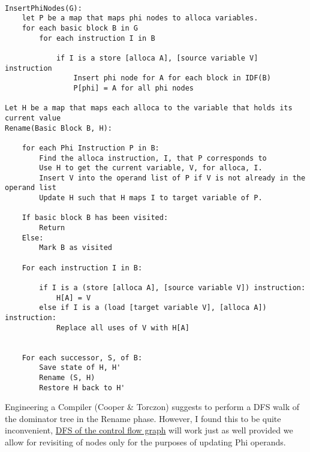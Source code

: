 \documentclass{article}
\begin{document}
\begin{verbatim}

InsertPhiNodes(G):
    let P be a map that maps phi nodes to alloca variables.
    for each basic block B in G
        for each instruction I in B

            if I is a store [alloca A], [source variable V] instruction
                Insert phi node for A for each block in IDF(B)
                P[phi] = A for all phi nodes

Let H be a map that maps each alloca to the variable that holds its current value
Rename(Basic Block B, H):

    for each Phi Instruction P in B:
        Find the alloca instruction, I, that P corresponds to
        Use H to get the current variable, V, for alloca, I.
        Insert V into the operand list of P if V is not already in the operand list
        Update H such that H maps I to target variable of P.
    
    If basic block B has been visited: 
        Return
    Else:
        Mark B as visited  
        
    For each instruction I in B: 
        
        if I is a (store [alloca A], [source variable V]) instruction: 
            H[A] = V 
        else if I is a (load [target variable V], [alloca A]) instruction:
            Replace all uses of V with H[A]
    
        
    For each successor, S, of B:
        Save state of H, H'
        Rename (S, H)
        Restore H back to H'
\end{verbatim}

Engineering a Compiler (Cooper \& Torczon) suggests to perform a DFS walk of
the dominator tree in the Rename phase. However, I found this to be quite
inconvenient,
\href{https://www.reddit.com/r/Compilers/comments/1dzp766/ssa_construction_dfs_of_cfg_vs_traversal_of/}{DFS
  of the control flow graph} will work just as well provided we allow for
revisiting of nodes only for the purposes of updating Phi operands.
\end{document}
